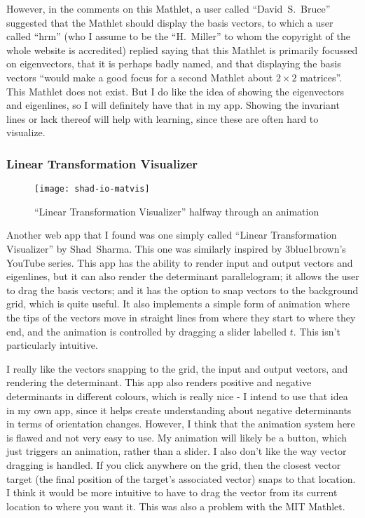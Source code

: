 \documentclass[../main.tex]{subfiles}
\begin{document}
However, in the comments on this Mathlet, a user called \enquote{David~S.~Bruce} suggested that the Mathlet should display the basis vectors, to which a user called \enquote{hrm} (who I assume to be the \enquote{H.~Miller} to whom the copyright of the whole website is accredited) replied saying that this Mathlet is primarily focussed on eigenvectors, that it is perhaps badly named, and that displaying the basis vectors \enquote{would make a good focus for a second Mathlet about $2 \times 2$ matrices}. This Mathlet does not exist. But I do like the idea of showing the eigenvectors and eigenlines, so I will definitely have that in my app. Showing the invariant lines or lack thereof will help with learning, since these are often hard to visualize.

\subsubsection{Linear Transformation Visualizer\label{subsubsection:shad-io-matvis}}

\begin{wrapfigure}{L}{0.5\linewidth}
	\vspace{-1em}
	\centering
	\texttt{[image: shad-io-matvis]}
	\caption{\enquote{Linear Transformation Visualizer} halfway through an animation}
	\label{fig:shad-io-matvis}
	\vspace{-1em}
\end{wrapfigure}

Another web app that I found was one simply called \enquote{Linear Transformation Visualizer} by Shad~Sharma\cite{shad-io-matvis}. This one was similarly inspired by 3blue1brown's YouTube series. This app has the ability to render input and output vectors and eigenlines, but it can also render the determinant parallelogram; it allows the user to drag the basis vectors; and it has the option to snap vectors to the background grid, which is quite useful. It also implements a simple form of animation where the tips of the vectors move in straight lines from where they start to where they end, and the animation is controlled by dragging a slider labelled $t$. This isn't particularly intuitive.

I really like the vectors snapping to the grid, the input and output vectors, and rendering the determinant. This app also renders positive and negative determinants in different colours, which is really nice - I intend to use that idea in my own app, since it helps create understanding about negative determinants in terms of orientation changes. However, I think that the animation system here is flawed and not very easy to use. My animation will likely be a button, which just triggers an animation, rather than a slider. I also don't like the way vector dragging is handled. If you click anywhere on the grid, then the closest vector target (the final position of the target's associated vector) snaps to that location. I think it would be more intuitive to have to drag the vector from its current location to where you want it. This was also a problem with the MIT Mathlet.
\end{document}
